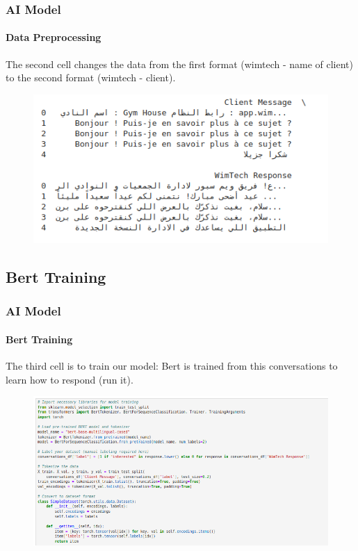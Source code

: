 \documentclass[
	11pt, %
]{beamer}
\begin{document}
\begin{frame}
	\frametitle{AI Model}
	\framesubtitle{Data Preprocessing} %
	
	The second cell changes the data from the first format (wimtech - name of client) to the second format (wimtech - client).

	\begin{figure}
		\includegraphics[width=0.8\linewidth]{formated_data.png}
	\end{figure}

\end{frame}

\subsection{Bert Training}

\begin{frame}
	\frametitle{AI Model}
	\framesubtitle{Bert Training} %
	
	The third cell is to train our model: Bert is trained from this conversations to learn how to respond (run it).

	\begin{figure}
		\includegraphics[width=0.9\linewidth]{bert_training.png}
	\end{figure}

\end{frame}
\end{document}
